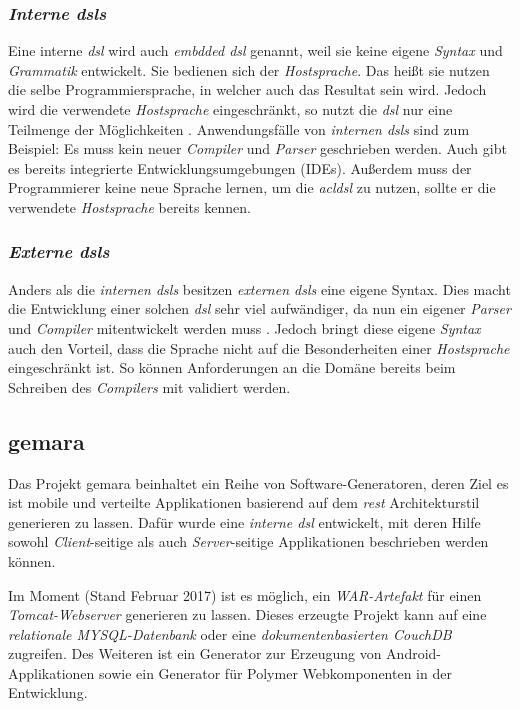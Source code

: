 \subsubsection{\textit{Interne \acsp{dsl}}} \label{sec:intern}
Eine interne \textit{\acs{dsl}} wird auch \textit{embdded \acs{dsl}} genannt, weil sie keine eigene \textit{Syntax} und \textit{Grammatik} entwickelt. Sie bedienen sich der \textit{Hostsprache}. Das heißt sie nutzen die selbe Programmiersprache, in welcher auch das Resultat sein wird.
Jedoch wird die verwendete \textit{Hostsprache} eingeschränkt, so nutzt die \textit{\acl{dsl}} nur eine Teilmenge der Möglichkeiten \cite{dsl}. Anwendungsfälle von \textit{internen \acsp{dsl}} sind zum Beispiel: Es muss kein neuer \textit{Compiler} und \textit{Parser} geschrieben werden. Auch gibt es bereits integrierte Entwicklungsumgebungen (IDEs). Außerdem muss der Programmierer keine neue Sprache lernen, um die \textit{acl{dsl}} zu nutzen, sollte er die verwendete \textit{Hostsprache} bereits kennen. 

\subsubsection{\textit{Externe \acsp{dsl}}} \label{sec:extern}

Anders als die \textit{internen \acsp{dsl}} besitzen \textit{externen \acsp{dsl}} eine eigene Syntax. Dies macht die Entwicklung einer solchen \textit{\acl{dsl}} sehr viel aufwändiger, da nun ein eigener \textit{Parser} und \textit{Compiler} mitentwickelt werden muss \cite{dsl}. Jedoch bringt diese eigene \textit{Syntax} auch den Vorteil, dass die Sprache nicht auf die Besonderheiten einer \textit{Hostsprache} eingeschränkt ist. So können Anforderungen an die Domäne bereits beim Schreiben des \textit{Compilers} mit validiert werden.

\subsection{\acf{gemara}}\label{sec:gemara}

Das Projekt \acs{gemara} beinhaltet ein Reihe von Software-Generatoren, deren Ziel es ist mobile und verteilte Applikationen basierend auf dem \textit{\acs{rest}} Architekturstil generieren zu lassen. Dafür wurde eine \textit{interne \acs{dsl}} entwickelt, mit deren Hilfe sowohl \textit{Client}-seitige als auch \textit{Server}-seitige Applikationen beschrieben werden können.

Im Moment (Stand Februar 2017) ist es möglich, ein \textit{WAR-Artefakt} für einen \textit{Tomcat-Webserver} generieren zu lassen. Dieses erzeugte Projekt kann auf eine \textit{relationale MYSQL-Datenbank} oder eine \textit{dokumentenbasierten CouchDB} zugreifen. Des Weiteren ist ein Generator zur Erzeugung von Android-Applikationen sowie ein Generator für Polymer Webkomponenten in der Entwicklung.

